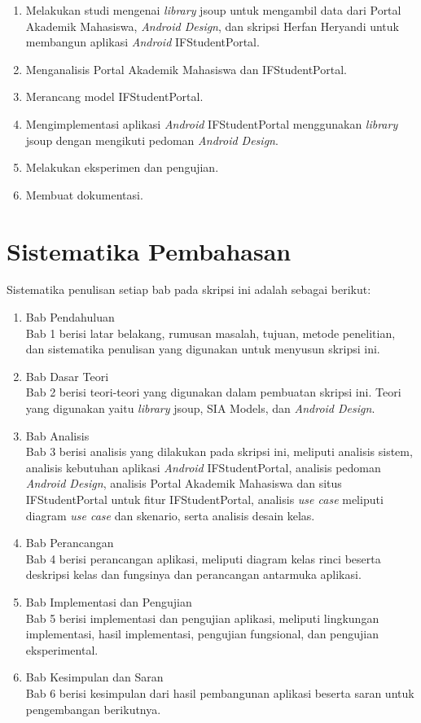 \begin{enumerate}
	\item Melakukan studi mengenai \textit{library} jsoup untuk mengambil data dari Portal Akademik Mahasiswa, \textit{Android Design}, dan skripsi Herfan Heryandi untuk membangun aplikasi \textit{Android} IFStudentPortal.
	\item Menganalisis Portal Akademik Mahasiswa dan IFStudentPortal.
	\item Merancang model IFStudentPortal.
	\item Mengimplementasi aplikasi \textit{Android} IFStudentPortal menggunakan \textit{library} jsoup dengan mengikuti pedoman \textit{Android Design}.
	\item Melakukan eksperimen dan pengujian.
	\item Membuat dokumentasi.
\end{enumerate}



\section{Sistematika Pembahasan}
\label{sec:sispem}
Sistematika penulisan setiap bab pada skripsi ini adalah sebagai berikut:

\begin{enumerate}
  \item Bab Pendahuluan \\
  Bab 1 berisi latar belakang, rumusan masalah, tujuan, metode penelitian,
  dan sistematika penulisan yang digunakan untuk menyusun skripsi ini.
  \item Bab Dasar Teori \\
  Bab 2 berisi teori-teori yang digunakan dalam pembuatan skripsi ini. Teori
  yang digunakan yaitu \textit{library} jsoup, SIA Models, dan \textit{Android Design}.
  \item Bab Analisis \\
  Bab 3 berisi analisis yang dilakukan pada skripsi ini, meliputi analisis sistem, analisis kebutuhan aplikasi \textit{Android} IFStudentPortal, analisis pedoman \textit{Android Design}, analisis Portal Akademik Mahasiswa dan situs IFStudentPortal untuk fitur IFStudentPortal, analisis \textit{use case} meliputi diagram \textsl{use case} dan skenario, serta analisis desain kelas. 
  \item Bab Perancangan \\
  Bab 4 berisi perancangan aplikasi, meliputi diagram kelas rinci beserta deskripsi kelas dan fungsinya dan perancangan antarmuka aplikasi.   
  \item Bab Implementasi dan Pengujian \\
  Bab 5 berisi implementasi dan pengujian aplikasi, meliputi lingkungan implementasi, hasil implementasi, pengujian fungsional, dan pengujian eksperimental.
  \item Bab Kesimpulan dan Saran \\
  Bab 6 berisi kesimpulan dari hasil pembangunan aplikasi beserta saran untuk pengembangan berikutnya.
\end{enumerate}
